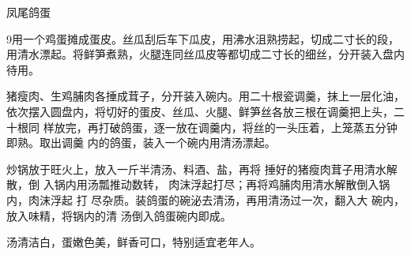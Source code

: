 \begin{recipe}{凤尾鸽蛋}

\ingredients


\preparation

\step 9用一个鸡蛋摊成蛋皮。丝瓜刮后车下瓜皮，用沸水沮熟捞起，切成二寸长的段，
用清水漂起。将鲜笋煮熟，火腿连同丝瓜皮等都切成二寸长的细丝，分开装入盘内待用。

\step 猪瘦肉、生鸡脯肉各捶成茸子，分开装入碗内。用二十根瓷调羹，抹上一层化油，
依次摆入圆盘内，将切好的蛋皮、丝瓜、火腿、鲜笋丝各放三根在调羹把上头，二十根同
样放完，再打破鸽蛋，逐一放在调羹内，将丝的一头压着，上笼蒸五分钟即熟。取出调羹
内的鸽蛋，装入一个碗内用清汤漂起。

炒锅放于旺火上，放入一斤半清汤、料酒、盐，再将 捶好的猪瘦肉茸子用清水解散，倒
入锅内用汤瓢推动数转， 肉沫浮起打尽；再将鸡脯肉用清水解散倒入锅内，肉沫浮起 打
尽杂质。装鸽蛋的碗泌去清汤，再用清汤过一次，翻入大 碗内，放入味精，将锅内的清
汤倒入鸽蛋碗内即成。

\features

汤清洁白，蛋嫩色美，鲜香可口，特别适宜老年人。

\end{recipe}

